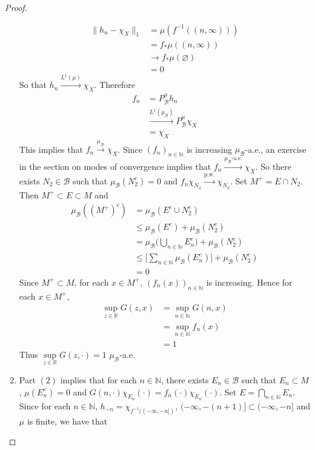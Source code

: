\documentclass{book}
\theoremstyle{definition}
\newcommand{\N}{\mathbb{N}}
\newcommand{\R}{\mathbb{R}}
\newcommand{\MB}{\mathcal{B}}
\DeclareMathOperator*{\0}{\mbf{0}}
\DeclareMathOperator*{\1}{\mbf{1}}
\newcommand{\convt}[1]{\xrightarrow{\text{#1}}}
\newcommand{\conv}[1]{\xrightarrow{#1}}
\begin{document}
\begin{proof}
\begin{enumerate}
			\begin{align*}
				\|h_n - \chi_{X}\|_1
				& = \mu(f^{-1}((n, \infty))) \\
				& = f_* \mu ((n, \infty)) \\
				& \rightarrow f_* \mu(\varnothing) \\
				& = 0 
			\end{align*}
			So that $h_{n} \conv{L^1(\mu)} \chi_{X}$. Therefore  
			\begin{align*}
				f_n 
				& = P^{\mu}_{\MB} h_n \\
				& \conv{L^1(\mu_{\MB})} P^{\mu}_{\MB} \chi_{X} \\
				& = \chi_{X}
			\end{align*}
			This implies that $f_n \conv{\mu_{\MB}} \chi_{X}$. Since $(f_n)_{n \in \N}$ is increasing $\mu_{\MB}$-a.e., an exercise in the section on modes of convergence implies that $f_n \convt{$\mu_{\MB}$-a.e.} \chi_{X}$. So there exists $N_2 \in \MB$ such that $\mu_{\MB}(N_2^c) = 0$ and $f_n \chi_{N_2} \convt{p.w.} \chi_{N_2}$. Set $M^+ = E \cap N_2$. Then  $M^+ \subset E \subset M$ and
			\begin{align*}
				\mu_{\MB}((M^+)^c)
				& = \mu_{\MB}(E^c \cup N_2^c) \\ 
				& \leq \mu_{\MB}(E^c) + \mu_{\MB}(N_2^c) \\
				& = \mu_{\MB} \bigg( \bigcup_{n \in \N} E_n^c \bigg) + \mu_{\MB}(N_2^c) \\
				& \leq \bigg[\sum_{n \in \N} \mu_{\MB}(E_n^c) \bigg] + \mu_{\MB}(N_2^c) \\
				& = 0
			\end{align*}
			Since $M^+ \subset M$, for each $x \in M^+$, $(f_n(x))_{n \in \N}$ is increasing. Hence for each $x \in M^+$,
			\begin{align*}
				\sup\limits_{z \in \R} G(z, x) 
				& = \sup\limits_{n \in \N} G(n, x) \\
				& = \sup\limits_{n \in \N} f_n(x) \\
				& = 1
			\end{align*}
			Thus $\sup\limits_{z \in \R} G(z, \cdot) = 1$ $\mu_{\MB}$-a.e.\\
		\item Part $(2)$ implies that for each $n \in \N$, there exists $E_n \in \MB$ such that $E_n \subset M$, $\mu(E_n^c) = 0$ and $G(n, \cdot)\chi_{E_n}(\cdot) = f_n(\cdot) \chi_{E_n}(\cdot)$. Set $E = \bigcap\limits_{n \in \N} E_n$. Since for each $n \in \N$, $h_{-n} = \chi_{f^{-1}((-\infty, -n])}$, $(-\infty, -(n + 1)] \subset (-\infty, -n]$ and $\mu$ is finite, we have that 

\end{enumerate}
\end{proof}
\end{document}
